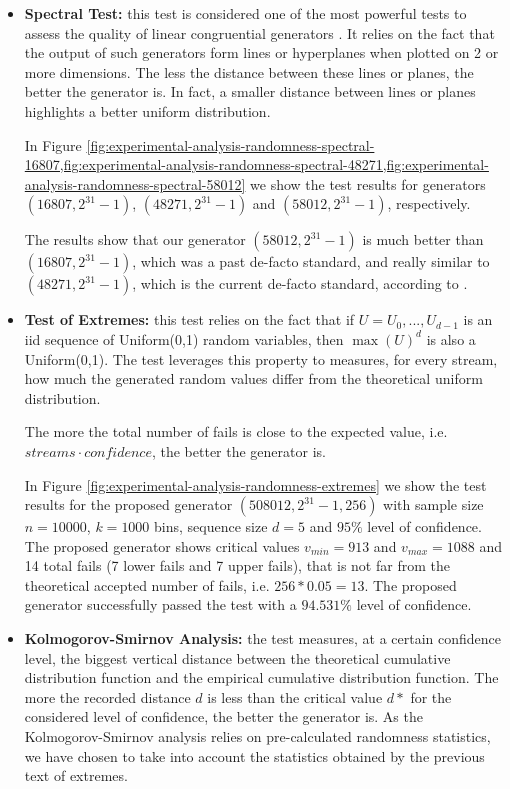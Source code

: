\begin{itemize}
	\item \textbf{Spectral Test:} this test is considered one of the most powerful tests to assess the quality of linear congruential generators \cite{knuth1981art}. It relies on the fact that the output of such generators form lines or hyperplanes when plotted on 2 or more dimensions. The less the distance between these lines or planes, the better the generator is. In fact, a smaller distance between lines or planes highlights a better uniform distribution.
	
	In Figure \ref{fig:experimental-analysis-randomness-spectral-16807,fig:experimental-analysis-randomness-spectral-48271,fig:experimental-analysis-randomness-spectral-58012} we show the test results for generators $(16807,2^{31}-1)$, $(48271,2^{31}-1)$ and $(58012,2^{31}-1)$, respectively.
	
	The results show that our generator $(58012,2^{31}-1)$ is much better than $(16807, 2^{31}-1)$, which was a past de-facto standard, and really similar to $(48271,2^{31}-1)$, which is the current de-facto standard, according to \cite{leemis2006discrete}.
	
	\item \textbf{Test of Extremes:} this test relies on the fact that if $U=U_{0},...,U_{d-1}$ is an iid sequence of Uniform(0,1) random variables, then $\max(U)^{d}$ is also a Uniform(0,1). The test leverages this property to measures, for every stream, how much the generated random values differ from the theoretical uniform distribution.
	
	The more the total number of fails is close to the expected value, i.e. $streams \cdot confidence$, the better the generator is.
	
	In Figure \ref{fig:experimental-analysis-randomness-extremes} we show the test results for the proposed generator $(508012,2^{31}-1, 256)$ with sample size $n=10000$, $k=1000$ bins, sequence size $d=5$ and $95\%$ level of confidence.
	The proposed generator shows critical values $v_{min}=913$ and $v_{max}=1088$ and 14 total fails (7 lower fails and 7 upper fails), that is not far from the theoretical accepted number of fails, i.e. $256*0.05=13$.
	The proposed generator successfully passed the test with a $94.531\%$ level of confidence.
	
	\item \textbf{Kolmogorov-Smirnov Analysis:} the test measures, at a certain confidence level, the biggest vertical distance between the theoretical cumulative distribution function and the empirical cumulative distribution function.
	The more the recorded distance $d$ is less than the critical value $d*$ for the considered level of confidence, the better the generator is.
	As the Kolmogorov-Smirnov analysis relies on pre-calculated randomness statistics, we have chosen to take into account the statistics obtained by the previous text of extremes.
	

\end{itemize}
